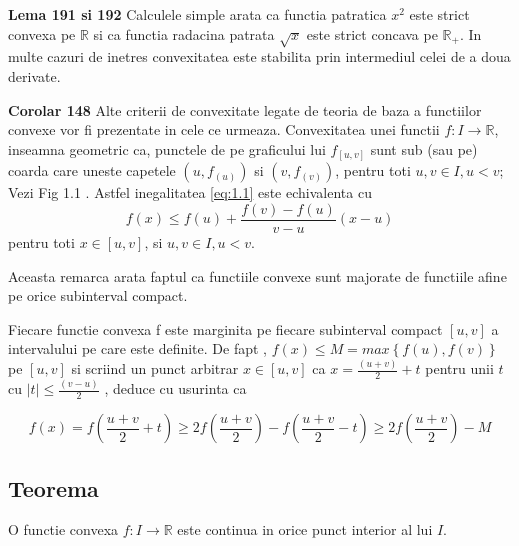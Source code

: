 \documentclass[a4paper,12pt,oneside]{report}
\begin{document}
\textbf{Lema 191 si 192} 
Calculele simple arata ca functia patratica \(x^{2}\) este strict convexa pe \(\mathbb{R}\) si ca functia radacina patrata \(\sqrt{x}\) este strict concava pe \(\mathbb{R}_{+}\). In multe cazuri de inetres convexitatea este stabilita prin intermediul celei de a doua derivate.

\textbf{Corolar 148}
Alte criterii de convexitate legate de teoria de baza a functiilor convexe vor fi prezentate in cele ce urmeaza. 
Convexitatea unei functii \(f : I\rightarrow \mathbb{R}\), inseamna geometric ca, punctele de pe graficului lui \(f_{\left [ u,v \right ]}\) sunt sub (sau pe) coarda care uneste capetele \(\left ( u , f_{\left ( u \right )} \right )\)  si \(\left ( v , f_{\left ( v \right )} \right )\), pentru toti \(u, v \in I, u < v\); 
Vezi Fig 1.1 . Astfel inegalitatea \ref{eq:1.1} este echivalenta cu 
\begin{displaymath}
	f\left ( x \right )\leq f\left ( u \right ) +\frac{f\left ( v \right )- f\left ( u \right )}{v - u}\left ( x - u \right ) \label{eq:1.2} \tag{1.2}
\end{displaymath}
pentru toti \(x\in \left [  u, v\right ]\), si \(u, v \in I, u < v\). 

%
%
%
%

Aceasta remarca arata faptul ca functiile convexe sunt majorate de functiile afine pe orice subinterval compact. 

Fiecare functie convexa f este marginita pe fiecare subinterval compact \(\left [ u , v \right ]\) a intervalului pe care este definite. De fapt , \(f\left ( x \right ) \leq  M = max \left \{ f\left ( u \right ), f\left ( v \right ) \right \}\)  pe \(\left [ u , v \right ]\)  si scriind un punct arbitrar \(x\in  \left [ u , v  \right ]\)  ca  \(x= \frac{\left ( u + v \right )}{2} + t\) pentru unii \(t\) cu \(\left | t \right |\leq \frac{\left ( v - u \right )}{2}\) , deduce cu usurinta ca 

\begin{displaymath}
  f\left ( x \right )=  f\left ( \frac{u+v}{2} + t\right )\geq 2 f\left ( \frac{u + v}{2} \right )- f\left ( \frac{u + v}{2} - t\right )\geq 2f\left ( \frac{u+v}{2} \right ) - M
\end{displaymath}

\subsection{Teorema}
O functie convexa \(f: I \rightarrow \mathbb{R}\) este continua in orice punct interior al lui \(I\). 	
\end{document}
